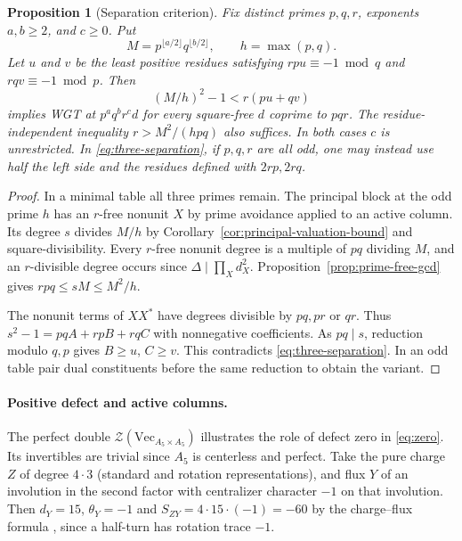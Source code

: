 \documentclass[11pt,a4paper]{article}
\numberwithin{equation}{section}
\newtheorem{proposition}[theorem]{Proposition}
\theoremstyle{remark}
\newcommand{\Z}{\mathcal Z}
\renewcommand{\Vec}{\mathrm{Vec}}
\begin{document}
\begin{proposition}[Separation criterion]\label{fam:M:4.14}\label{prop:three-separation}
Fix distinct primes $p,q,r$, exponents $a,b\ge2$, and $c\ge0$.
Put
\[
 M=p^{\lfloor a/2\rfloor}q^{\lfloor b/2\rfloor},\qquad
 h=\max(p,q).
\]
Let $u$ and $v$ be the least positive residues satisfying
$rp u\equiv-1\bmod q$ and $rq v\equiv-1\bmod p$.
Then
\begin{equation}\label{eq:three-separation}
                       (M/h)^2-1<r(pu+qv)
\end{equation}
implies WGT at $p^a q^b r^c d$ for every square-free $d$ coprime to $pqr$.
The residue-independent inequality $r>M^2/(hpq)$ also suffices.
In both cases $c$ is unrestricted. In \eqref{eq:three-separation}, if $p,q,r$ are all odd, one may instead use half
the left side and the residues defined with $2rp,2rq$.

\end{proposition}
\begin{proof}
In a minimal table all three primes remain. The principal block at
the odd prime $h$ has an $r$-free nonunit $X$ by prime avoidance
applied to an active column. Its degree $s$ divides $M/h$ by
Corollary~\ref{cor:principal-valuation-bound} and square-divisibility.
Every $r$-free nonunit degree is a multiple of $pq$ dividing $M$,
and an $r$-divisible degree occurs since $\Delta\mid\prod_Xd_X^2$.
Proposition~\ref{prop:prime-free-gcd} gives $rpq\le sM\le M^2/h$.

The nonunit terms of $XX^*$ have degrees divisible by $pq,pr$ or
$qr$. Thus $s^2-1=pqA+rpB+rqC$ with nonnegative coefficients.
As $pq\mid s$, reduction modulo $q,p$ gives $B\ge u$, $C\ge v$.
This contradicts \eqref{eq:three-separation}. In an odd table pair
dual constituents before the same reduction to obtain the variant.
\end{proof}

\paragraph{Positive defect and active columns.}
The perfect double $\Z(\Vec_{A_5\times A_5})$ illustrates the role
of defect zero in \eqref{eq:zero}. Its invertibles are trivial since
$A_5$ is centerless and perfect. Take the pure charge $Z$ of degree
$4\cdot3$ (standard and rotation representations), and flux $Y$ of
an involution in the second factor with centralizer character $-1$
on that involution. Then $d_Y=15$, $\theta_Y=-1$ and
$S_{ZY}=4\cdot15\cdot(-1)=-60$ by the charge--flux formula
\cite[Section~3.1, p.~4189]{NNW}, since a half-turn has rotation trace $-1$.
\end{document}
